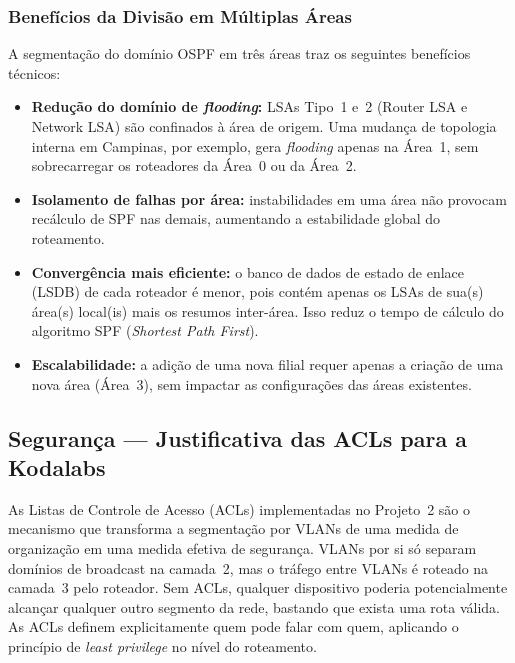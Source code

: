 \documentclass[12pt,a4paper]{article}
\begin{document}
\subsubsection{Benefícios da Divisão em Múltiplas Áreas}

A segmentação do domínio OSPF em três áreas traz os seguintes benefícios técnicos:

\begin{itemize}
    \item \textbf{Redução do domínio de \textit{flooding}:} LSAs Tipo~1 e~2
    (Router LSA e Network LSA) são confinados à área de origem. Uma mudança de
    topologia interna em Campinas, por exemplo, gera \textit{flooding} apenas na
    Área~1, sem sobrecarregar os roteadores da Área~0 ou da Área~2.
    \item \textbf{Isolamento de falhas por área:} instabilidades em uma área não
    provocam recálculo de SPF nas demais, aumentando a estabilidade global do
    roteamento.
    \item \textbf{Convergência mais eficiente:} o banco de dados de estado de enlace
    (LSDB) de cada roteador é menor, pois contém apenas os LSAs de sua(s) área(s)
    local(is) mais os resumos inter-área. Isso reduz o tempo de cálculo do algoritmo
    SPF (\textit{Shortest Path First}).
    \item \textbf{Escalabilidade:} a adição de uma nova filial requer apenas a criação de uma nova área (Área~3), sem impactar as
    configurações das áreas existentes.
\end{itemize}

\subsection{Segurança — Justificativa das ACLs para a Kodalabs}

As Listas de Controle de Acesso (ACLs) implementadas no Projeto~2 são o mecanismo
que transforma a segmentação por VLANs de uma medida de organização em uma medida
efetiva de segurança. VLANs por si só separam domínios de broadcast na camada~2,
mas o tráfego entre VLANs é roteado na camada~3 pelo roteador. Sem ACLs, qualquer
dispositivo poderia potencialmente alcançar qualquer outro segmento da rede,
bastando que exista uma rota válida. As ACLs definem explicitamente quem pode falar
com quem, aplicando o princípio de \textit{least privilege} no nível do roteamento.
\end{document}
